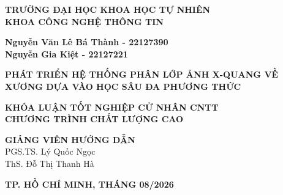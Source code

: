 \begin{titlepage}






\begin{center}
\vspace*{0.3cm}

{\bfseries TRƯỜNG ĐẠI HỌC KHOA HỌC TỰ NHIÊN\\
KHOA CÔNG NGHỆ THÔNG TIN\\[2cm]}

{\large \bfseries Nguyễn Văn Lê Bá Thành - 22127390\\} {\large \bfseries Nguyễn Gia Kiệt - 22127221\\[2cm]}

{ \Large \bfseries PHÁT TRIỂN HỆ THỐNG PHÂN LỚP ẢNH X-QUANG VỀ XƯƠNG DỰA VÀO HỌC SÂU ĐA PHƯƠNG THỨC\\[2cm] }

{\bfseries KHÓA LUẬN TỐT NGHIỆP CỬ NHÂN CNTT\\
CHƯƠNG TRÌNH CHẤT LƯỢNG CAO\\[2cm]}

\textbf{GIẢNG VIÊN HƯỚNG DẪN}\\
PGS.TS. Lý Quốc Ngọc\\
ThS. Đỗ Thị Thanh Hà


\vfill {\bfseries TP. HỒ CHÍ MINH, THÁNG 08/2026}

\end{center}

\end{titlepage}

